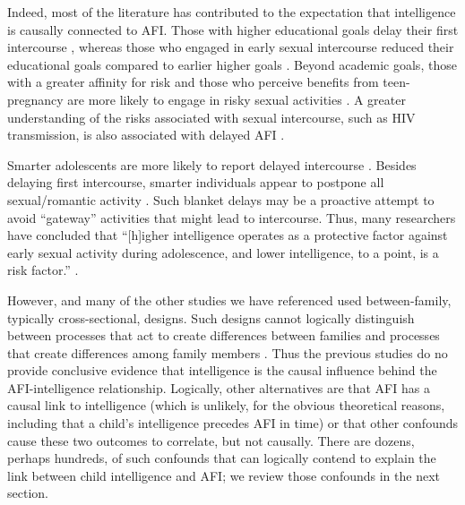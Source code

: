 Indeed, most of the literature has contributed to the expectation that intelligence is causally connected to AFI. Those with higher educational goals delay their first intercourse \citep{boislard2011individual,schvaneveldt2001academic}, whereas those who engaged in early sexual intercourse reduced their educational goals compared to earlier higher goals \citep{schvaneveldt2001academic}. Beyond academic goals, those with a greater affinity for risk and those who perceive benefits from teen-pregnancy are more likely to engage in risky sexual activities \citep{raffaelli2003sexual}. A greater understanding of the risks associated with sexual intercourse, such as HIV transmission, is also associated with delayed AFI \citep{mathews2009predictors}.

Smarter adolescents are more likely to report delayed intercourse \citep{halpern2000smart,mott1983early,Paul2000,Woodward2001}. Besides delaying first intercourse, smarter individuals appear to postpone all sexual/romantic activity \citep{halpern2000smart}. Such blanket delays may be a proactive attempt to avoid ``gateway'' activities that might lead to intercourse. Thus, many researchers have concluded that ``[h]igher intelligence operates as a protective factor against early sexual activity during adolescence, and lower intelligence, to a point, is a risk factor.'' \citep[][p. 213]{halpern2000smart}.

However, \citet{halpern2000smart} and many of the other studies we have referenced \citep[e.g.,][]{mathews2009predictors,miller1997timing,Paul2000} used between-family, typically cross-sectional, designs. Such designs cannot logically distinguish between processes that act to create differences between families and processes that create differences among family members \citep{Lahey2010,Rodgers2000}. Thus the previous studies do no provide conclusive evidence that intelligence is the causal influence behind the AFI-intelligence relationship. Logically, other alternatives are that AFI has a causal link to intelligence (which is unlikely, for the obvious theoretical reasons, including that a child's intelligence precedes AFI in time) or that other confounds cause these two outcomes to correlate, but not causally. There are dozens, perhaps hundreds, of such confounds that can logically contend to explain the link between child intelligence and AFI; we review those confounds in the next section.
%
